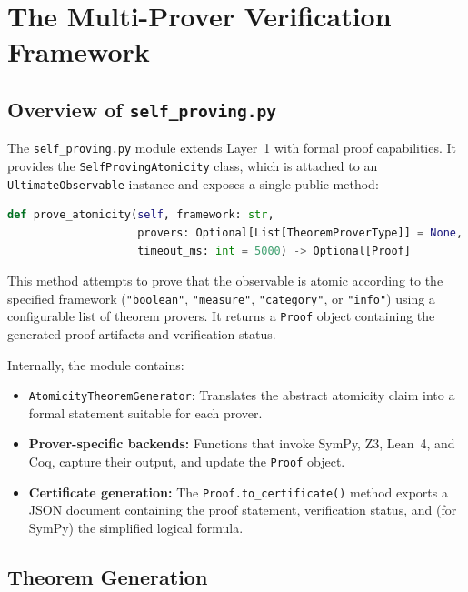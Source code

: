 \newpage
\section{The Multi-Prover Verification Framework}

\subsection{Overview of \texttt{self\_proving.py}}

The \texttt{self\_proving.py} module extends Layer~1 with formal proof capabilities. It provides the \texttt{SelfProvingAtomicity} class, which is attached to an \texttt{UltimateObservable} instance and exposes a single public method:

\begin{lstlisting}[language=Python, caption={Public interface of \texttt{SelfProvingAtomicity}.}]
def prove_atomicity(self, framework: str,
                    provers: Optional[List[TheoremProverType]] = None,
                    timeout_ms: int = 5000) -> Optional[Proof]
\end{lstlisting}

This method attempts to prove that the observable is atomic according to the specified framework (\texttt{"boolean"}, \texttt{"measure"}, \texttt{"category"}, or \texttt{"info"}) using a configurable list of theorem provers. It returns a \texttt{Proof} object containing the generated proof artifacts and verification status.

Internally, the module contains:
\begin{itemize}
    \item \texttt{AtomicityTheoremGenerator}: Translates the abstract atomicity claim into a formal statement suitable for each prover.
    \item \textbf{Prover-specific backends:} Functions that invoke SymPy, Z3, Lean~4, and Coq, capture their output, and update the \texttt{Proof} object.
    \item \textbf{Certificate generation:} The \texttt{Proof.to\_certificate()} method exports a JSON document containing the proof statement, verification status, and (for SymPy) the simplified logical formula.
\end{itemize}




\subsection{Theorem Generation}

